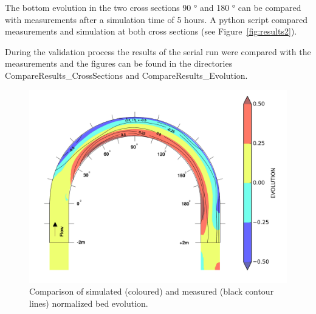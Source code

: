 The bottom evolution in the two cross sections 90 ° and 180 ° can be compared with measurements
after a simulation time of 5 hours. 
A python script compared measurements and simulation at both cross sections (see Figure~\ref{fig:results2}).

During the validation process the results of the serial run were compared with the measurements and the figures can be found in the directories
CompareResults\_CrossSections and CompareResults\_Evolution. 

\begin{figure} [!h]
\centering
\includegraphics[width=.96\textwidth]{../img/EvolutionR05.png}
 \caption{Comparison of simulated (coloured) and measured (black contour lines) normalized bed evolution.}\label{fig:results1}
\end{figure}

